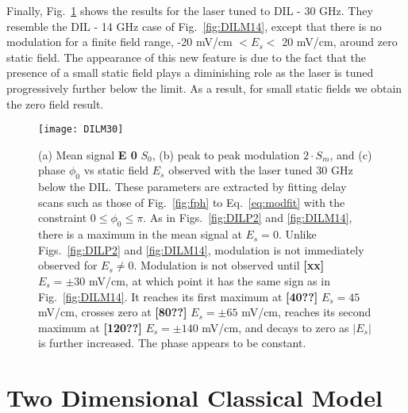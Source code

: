 \documentclass[aps,pra,preprint,groupedaddress]{revtex4-1}
\begin{document}
Finally, Fig.~\ref{fig:DILM30} shows the results for the laser tuned to DIL - 30 GHz. They resemble the DIL - 14 GHz case of Fig.~\ref{fig:DILM14}, except that there is no modulation for a finite field range, -20 mV/cm $<E_s<$ 20 mV/cm, around zero static field. The appearance of this new feature is due to the fact that the presence of a small static field plays a diminishing role as the laser is tuned progressively further below the limit. As a result, for small static fields we obtain the zero field result.


\begin{figure}
	\texttt{[image: DILM30]}
	\caption{(a) Mean signal \textbf{E 0} $S_0$, (b) peak to peak modulation $2 \cdot S_m$, and (c) phase $\phi_0$ vs static field $E_s$ observed with the laser tuned 30 GHz below the DIL. These parameters are extracted by fitting delay scans such as those of Fig.~\ref{fig:fph} to Eq.~\ref{eq:modfit} with the constraint $0\leq\phi_0\leq\pi$. As in Figs.~\ref{fig:DILP2} and \ref{fig:DILM14}, there is a maximum in the mean signal at $E_s=0$. Unlike Figs.~\ref{fig:DILP2} and \ref{fig:DILM14}, modulation is not immediately observed for $E_s\neq 0$. Modulation is not observed until \textbf{[xx]} $E_s=\pm 30$ mV/cm, at which point it has the same sign as in Fig.~\ref{fig:DILM14}. It reaches its first maximum at \textbf{[40??]} $E_s=45$ mV/cm, crosses zero at \textbf{[80??]} $E_s=\pm 65$ mV/cm, reaches its second maximum at \textbf{[120??]} $E_s=\pm 140$ mV/cm, and decays to zero as $|E_s|$ is further increased. The phase appears to be constant.}
	\label{fig:DILM30}
\end{figure}


\section{\label{sec:disc} Two Dimensional Classical Model}
\end{document}
